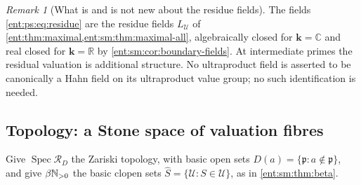 \documentclass[11pt]{article}
\theoremstyle{plain}
\theoremstyle{plain}
\theoremstyle{plain}
\theoremstyle{definition}
\theoremstyle{definition}
\theoremstyle{definition}
\theoremstyle{definition}
\theoremstyle{remark}
\newtheorem{remark}[remark]{Remark}
\newcommand{\C}{\mathbb C}\newcommand{\R}{\mathbb R}
\DeclareMathOperator{\Spec}{Spec}\DeclareMathOperator{\red}{red}
\newcommand{\RD}{\mathcal R_D}\newcommand{\Ucal}{\mathcal U}
\newcommand{\kk}{\mathbf k}\newcommand{\PP}{\mathbb P}
\begin{document}
\begin{remark}[What is and is not new about the residue fields]
The fields \eqref{ent:ps:eq:residue} are the residue fields $L_\Ucal$ of
\cref{ent:thm:maximal,ent:sm:thm:maximal-all}, algebraically closed for
$\kk=\C$ and real closed for $\kk=\R$ by \cref{ent:sm:cor:boundary-fields}.
At intermediate primes the residual valuation is additional structure. No
ultraproduct field is asserted to be canonically a Hahn field on its
ultraproduct value group; no such identification is needed.
\end{remark}

\subsection{Topology: a Stone space of valuation fibres}
\label{ent:ps:subsec:topology}

Give $\Spec\RD$ the Zariski topology, with basic open sets
$D(a)=\{\mathfrak p:a\notin\mathfrak p\}$, and give $\beta\mathbb N_{>0}$ the basic
clopen sets $\widehat S=\{\Ucal:S\in\Ucal\}$, as in \cref{ent:sm:thm:beta}.
\end{document}
